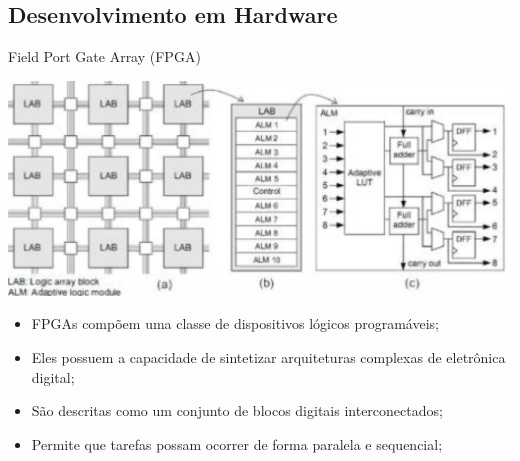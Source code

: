 \documentclass{if-beamer}
\begin{document}
\subsection{Desenvolvimento em Hardware}
\begin{frame}{Field Port Gate Array (FPGA)}
	\begin{minipage}{0.5\textwidth}
	
			\includegraphics[scale=0.25]{FPGA Stratix X da Intel.png}
		
	\end{minipage}%
	\hspace{0.04\textwidth}
	\begin{minipage}{0.5\textwidth}
		\begin{itemize}
			\item FPGAs compõem uma classe de dispositivos lógicos programáveis;
			\item Eles possuem a capacidade de sintetizar arquiteturas complexas de eletrônica digital;
			\item São descritas como um conjunto de blocos digitais interconectados;
			\item Permite que tarefas possam ocorrer de forma paralela e sequencial;
			
		\end{itemize}
	\end{minipage}
\end{frame}
\end{document}
